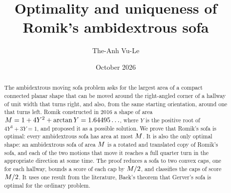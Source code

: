 \documentclass[11pt,reqno]{amsart}
\title{Optimality and uniqueness of Romik's ambidextrous sofa}
\author{The-Anh Vu-Le}
\date{October 2026}
\theoremstyle{plain}
\theoremstyle{definition}
\theoremstyle{remark}
\numberwithin{equation}{section}
\begin{document}
\begin{abstract}
  The ambidextrous moving sofa problem asks for the largest area of a compact
  connected planar shape that can be moved around the right-angled corner of a
  hallway of unit width that turns right, and also, from the same starting
  orientation, around one that turns left. Romik constructed in 2016 a shape of
  area $M = 1 + 4Y^2 + \arctan Y = 1.64495\ldots$, where $Y$ is the positive
  root of $4Y^3 + 3Y = 1$, and proposed it as a possible solution. We prove that
  Romik's sofa is optimal: every ambidextrous sofa has area at most $M$. It is
  also the only optimal shape: an ambidextrous sofa of area $M$ is a rotated
  and translated copy of Romik's sofa, and each of the two motions that move it
  reaches a full quarter turn in the appropriate direction at some time. The proof reduces a sofa to two convex
  caps, one for each hallway, bounds a score of each cap by $M/2$, and
  classifies the caps of score $M/2$. It uses one result from the
  literature, Baek's theorem that Gerver's sofa is optimal for the ordinary
  problem.
\end{abstract}

\maketitle













\appendix
{}











\end{document}
